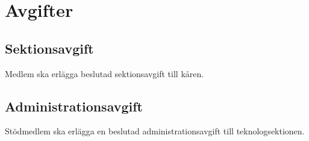 \section{Avgifter}
\subsection{Sektionsavgift}
Medlem ska erlägga beslutad sektionsavgift till kåren.
\subsection{Administrationsavgift}
Stödmedlem ska erlägga en beslutad administrationsavgift till teknologsektionen.

